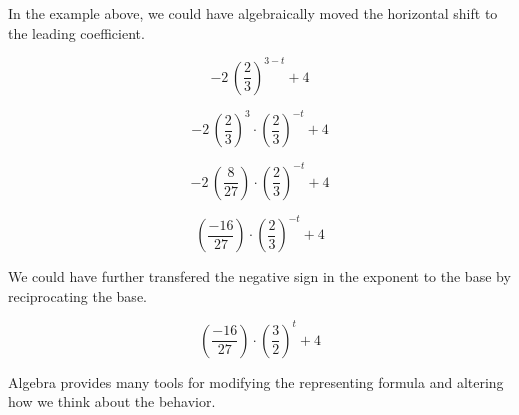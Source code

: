 \documentclass{ximera}
\begin{document}
\begin{example}
\begin{explanation}
\end{explanation}

\end{example}





In the example above, we could have algebraically moved the horizontal shift to the leading coefficient.



\[
-2 \, \left( \frac{2}{3} \right)^{3-t} + 4
\]


\[
-2 \, \left( \frac{2}{3} \right)^{3} \cdot \left( \frac{2}{3} \right)^{-t}+ 4
\]


\[
-2 \, \left( \frac{8}{27} \right)  \cdot \left( \frac{2}{3} \right)^{-t}+ 4
\]


\[
\left( \frac{-16}{27} \right)  \cdot \left( \frac{2}{3} \right)^{-t}+ 4
\]


We could have further transfered the negative sign in the exponent to the base by reciprocating the base.

\[
\left( \frac{-16}{27} \right)  \cdot \left( \frac{3}{2} \right)^t+ 4
\]



Algebra provides many tools for modifying the representing formula and altering how we think about the behavior. \\
\end{document}
